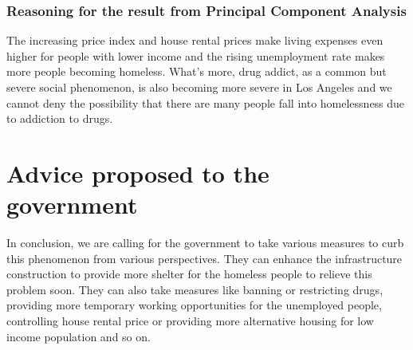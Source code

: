 \documentclass[]{article}
\begin{document}
\hypertarget{reasoning-for-the-result-from-principal-component-analysis}{%
\subsubsection{Reasoning for the result from Principal Component
Analysis}\label{reasoning-for-the-result-from-principal-component-analysis}}

The increasing price index and house rental prices make living expenses
even higher for people with lower income and the rising unemployment
rate makes more people becoming homeless. What's more, drug addict, as a
common but severe social phenomenon, is also becoming more severe in Los
Angeles and we cannot deny the possibility that there are many people
fall into homelessness due to addiction to drugs.

\hypertarget{advice-proposed-to-the-government}{%
\section{Advice proposed to the
government}\label{advice-proposed-to-the-government}}

In conclusion, we are calling for the government to take various
measures to curb this phenomenon from various perspectives. They can
enhance the infrastructure construction to provide more shelter for the
homeless people to relieve this problem soon. They can also take
measures like banning or restricting drugs, providing more temporary
working opportunities for the unemployed people, controlling house
rental price or providing more alternative housing for low income
population and so on.
\end{document}
